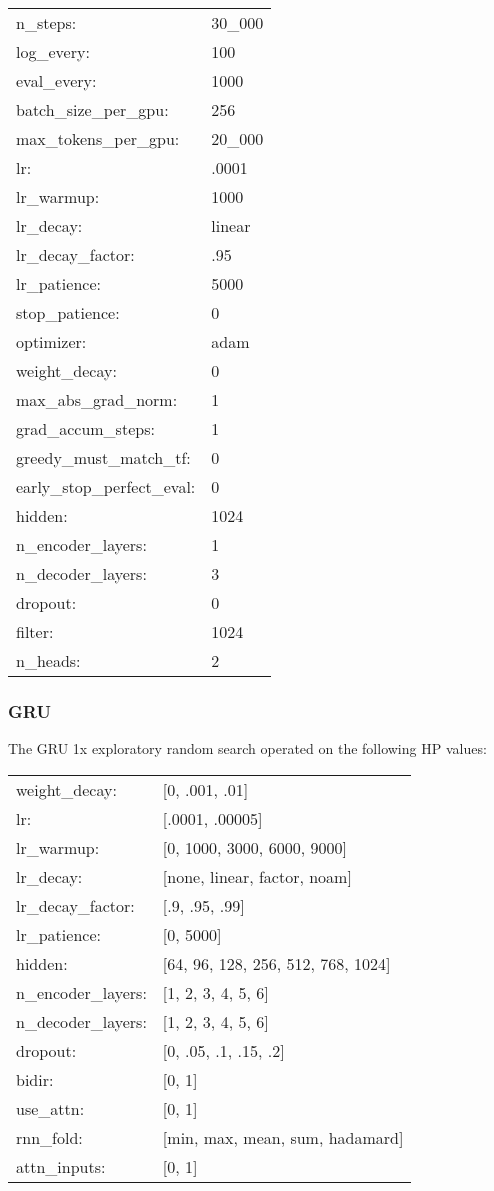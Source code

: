 \begin{tabular}{ll}
    n\_steps: & 30\_000 \\  
    log\_every: & 100 \\
    eval\_every: & 1000 \\
    batch\_size\_per\_gpu: & 256 \\
    max\_tokens\_per\_gpu: & 20\_000   \\
    lr: & .0001 \\
    lr\_warmup: & 1000 \\
    lr\_decay: & linear \\
    lr\_decay\_factor: & .95 \\
    lr\_patience: & 5000 \\
    stop\_patience: & 0 \\
    optimizer: & adam \\    
    weight\_decay: & 0 \\
    max\_abs\_grad\_norm: & 1 \\
    grad\_accum\_steps: & 1 \\
    greedy\_must\_match\_tf: & 0 \\
    early\_stop\_perfect\_eval: & 0 \\
    hidden: & 1024 \\
    n\_encoder\_layers: & 1 \\
    n\_decoder\_layers: & 3 \\
    dropout: & 0 \\
    filter: & 1024 \\
    n\_heads: & 2 \\     
\end{tabular}

\pagebreak
\iffalse
\subsubsection{GRU}

The GRU 1x exploratory random search operated on the following HP values:

\begin{tabular}{ll}
       weight\_decay: & [0, .001, .01] \\
    lr: & [.0001, .00005] \\
    lr\_warmup: & [0, 1000, 3000, 6000, 9000] \\
    lr\_decay: & [none, linear, factor, noam] \\
    lr\_decay\_factor: & [.9, .95, .99] \\
    lr\_patience: & [0, 5000] \\
    hidden: & [64, 96, 128, 256, 512, 768, 1024] \\
    n\_encoder\_layers: & [1, 2, 3, 4, 5, 6] \\
    n\_decoder\_layers: & [1, 2, 3, 4, 5, 6] \\
    dropout: & [0, .05, .1, .15, .2] \\
    bidir: & [0, 1] \\
    use\_attn: & [0, 1] \\
    rnn\_fold: & [min, max, mean, sum, hadamard] \\
    attn\_inputs: & [0, 1] \\  
\end{tabular}
\vskip 0.15in

